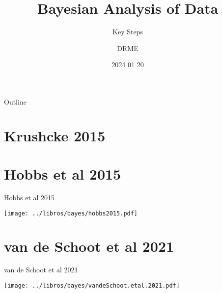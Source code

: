 \documentclass{beamer}
\begin{document}
\title{Bayesian Analysis of Data}
\subtitle{Key Steps}
\author{DRME}
\date{2024 01 20}

\begin{frame}
  \titlepage
\end{frame}

\begin{frame}{Outline}
  \tableofcontents
\end{frame}

\section{Krushcke 2015}




\section{Hobbs et al 2015}

\begin{frame}{Hobbs et al 2015}
  
  \begin{center}
  \texttt{[image: ../libros/bayes/hobbs2015.pdf]}
  \end{center}
  
\end{frame}






\section{van de Schoot et al 2021}

\begin{frame}{van de Schoot et al 2021}
  
  \begin{center}
  \texttt{[image: ../libros/bayes/vandeSchoot.etal.2021.pdf]}
  \end{center}
  
\end{frame}
\end{document}
